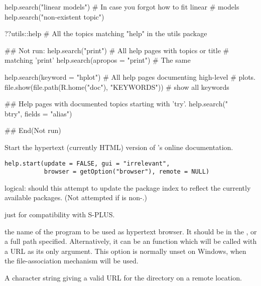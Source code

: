 %
\begin{Examples}
\begin{ExampleCode}
help.search("linear models")    # In case you forgot how to fit linear
                                # models
help.search("non-existent topic")

??utils::help  # All the topics matching "help" in the utils package

## Not run: 
help.search("print")            # All help pages with topics or title
                                # matching 'print'
help.search(apropos = "print")  # The same

help.search(keyword = "hplot")  # All help pages documenting high-level
                                # plots.
file.show(file.path(R.home("doc"), "KEYWORDS"))  # show all keywords

## Help pages with documented topics starting with 'try'.
help.search("\\btry", fields = "alias")

## End(Not run)
\end{ExampleCode}
\end{Examples}
%
\begin{Description}\relax
Start the hypertext (currently HTML) version of \R{}'s online
documentation.
\end{Description}
%
\begin{Usage}
\begin{verbatim}
help.start(update = FALSE, gui = "irrelevant",
           browser = getOption("browser"), remote = NULL)
\end{verbatim}
\end{Usage}
%
\begin{Arguments}
\begin{ldescription}
\item[\code{update}] logical: should this attempt to update the package index to
reflect the currently available packages.  (Not attempted if
 is non-.)
\item[\code{gui}] just for compatibility with S-PLUS.
\item[\code{browser}] the name of the program to be used as hypertext
browser.  It should be in the , or a full path specified.
Alternatively, it can be an \R{} function which will be called with a
URL as its only argument. This option is normally unset on Windows,
when the file-association mechanism will be used.
\item[\code{remote}] A character string giving a valid URL for the
 directory on a remote location.
\end{ldescription}
\end{Arguments}
